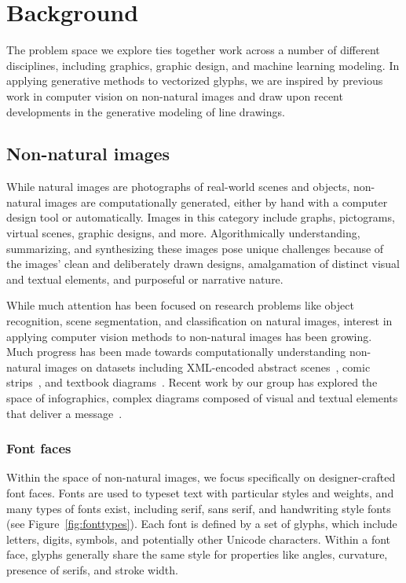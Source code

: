 \chapter{Background}
The problem space we explore ties together work across a number of different disciplines, including graphics, graphic design, and machine learning modeling.
In applying generative methods to vectorized glyphs, we are inspired by previous work in computer vision on non-natural images and draw upon recent developments in the generative modeling of line drawings.

\section{Non-natural images}
While natural images are photographs of real-world scenes and objects, non-natural images are computationally generated, either by hand with a computer design tool or automatically.
Images in this category include graphs, pictograms, virtual scenes, graphic designs, and more.
Algorithmically understanding, summarizing, and synthesizing these images pose unique challenges because of the images' clean and deliberately drawn designs, amalgamation of distinct visual and textual elements, and purposeful or narrative nature.

While much attention has been focused on research problems like object recognition, scene segmentation, and classification on natural images, interest in applying computer vision methods to non-natural images has been growing.
Much progress has been made towards computationally understanding non-natural images on datasets including XML-encoded abstract scenes~\cite{wu2017neural}, comic strips~\cite{iyyer2016amazing}, and textbook diagrams~\cite{seo2014diagram}.
Recent work by our group has explored the space of infographics, complex diagrams composed of visual and textual elements that deliver a message~\cite{bylinskii2017understanding}.

\subsection{Font faces}
Within the space of non-natural images, we focus specifically on designer-crafted font faces.
Fonts are used to typeset text with particular styles and weights, and many types of fonts exist, including serif, sans serif, and handwriting style fonts (see Figure~\ref{fig:fonttypes}).
Each font is defined by a set of glyphs, which include letters, digits, symbols, and potentially other Unicode characters.
Within a font face, glyphs generally share the same style for properties like angles, curvature, presence of serifs, and stroke width.

